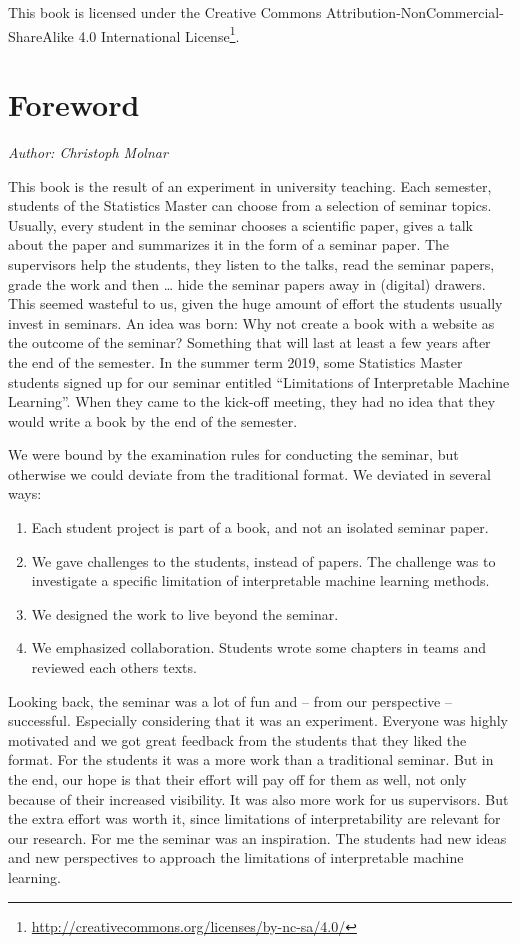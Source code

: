 \documentclass[]{krantz}
\providecommand{\tightlist}{%
  \setlength{\itemsep}{0pt}\setlength{\parskip}{0pt}}
\renewcommand{\href}[2]{#2\footnote{\url{#1}}}
\begin{document}
This book is licensed under the
\href{http://creativecommons.org/licenses/by-nc-sa/4.0/}{Creative
Commons Attribution-NonCommercial-ShareAlike 4.0 International License}.

\mainmatter

\chapter*{Foreword}\label{foreword}


\emph{Author: Christoph Molnar}

This book is the result of an experiment in university teaching. Each
semester, students of the Statistics Master can choose from a selection
of seminar topics. Usually, every student in the seminar chooses a
scientific paper, gives a talk about the paper and summarizes it in the
form of a seminar paper. The supervisors help the students, they listen
to the talks, read the seminar papers, grade the work and then \ldots{}
hide the seminar papers away in (digital) drawers. This seemed wasteful
to us, given the huge amount of effort the students usually invest in
seminars. An idea was born: Why not create a book with a website as the
outcome of the seminar? Something that will last at least a few years
after the end of the semester. In the summer term 2019, some Statistics
Master students signed up for our seminar entitled ``Limitations of
Interpretable Machine Learning''. When they came to the kick-off
meeting, they had no idea that they would write a book by the end of the
semester.

We were bound by the examination rules for conducting the seminar, but
otherwise we could deviate from the traditional format. We deviated in
several ways:

\begin{enumerate}
\def\labelenumi{\arabic{enumi}.}
\tightlist
\item
  Each student project is part of a book, and not an isolated seminar
  paper.
\item
  We gave challenges to the students, instead of papers. The challenge
  was to investigate a specific limitation of interpretable machine
  learning methods.
\item
  We designed the work to live beyond the seminar.
\item
  We emphasized collaboration. Students wrote some chapters in teams and
  reviewed each others texts.
\end{enumerate}

Looking back, the seminar was a lot of fun and -- from our perspective
-- successful. Especially considering that it was an experiment.
Everyone was highly motivated and we got great feedback from the
students that they liked the format. For the students it was a more work
than a traditional seminar. But in the end, our hope is that their
effort will pay off for them as well, not only because of their
increased visibility. It was also more work for us supervisors. But the
extra effort was worth it, since limitations of interpretability are
relevant for our research. For me the seminar was an inspiration. The
students had new ideas and new perspectives to approach the limitations
of interpretable machine learning.
\end{document}
